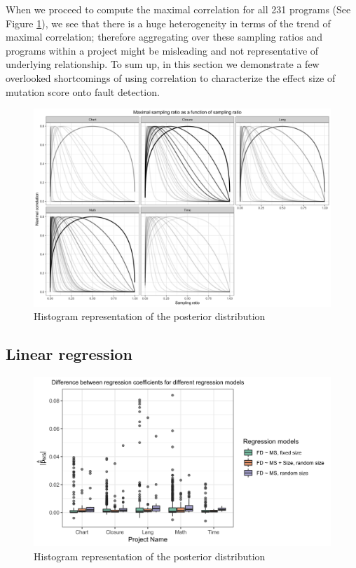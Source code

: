 \documentclass[10pt,letterpaper]{article}
\begin{document}
When we proceed to compute the maximal correlation for all 231 programs (See Figure \ref{fig:max_cor_all_231}), we see that there is a huge heterogeneity in terms of the trend of maximal correlation; therefore aggregating over these sampling ratios and programs within a project might be misleading and not representative of underlying relationship. To sum up, in this section we demonstrate a few overlooked shortcomings of using correlation to characterize the effect size of mutation score onto fault detection. 
    

  \begin{figure}[ht!]
        \centering
        \includegraphics[scale=0.07]{figures/maximal_correlation.png}
        \caption{Histogram representation of the posterior distribution}
        \label{fig:max_cor_all_231}
    \end{figure}
    

\subsection{Linear regression}



  \begin{figure}[ht!]
        \centering
        \includegraphics[scale=0.15]{figures/beta_coef_size.png}
        \caption{Histogram representation of the posterior distribution}
        \label{fig:beta_coef_size}
    \end{figure}
    
\end{document}
